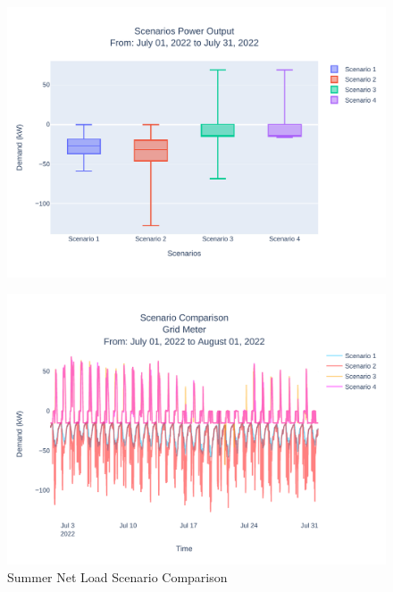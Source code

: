\documentclass[conference]{IEEEtran}
\begin{document}
	\begin{figure}[H]
		\centering
		\includegraphics[width=1\linewidth]{Fig/4_Scn_Output_Run_2_Jul_01_2022_to_Jul_31_2022}
		\caption{}
		\label{fig:4scnoutputrun2jul012022tojul312022}
	\end{figure}
	
	



    
	\begin{figure}[H]
		\centering
		\includegraphics[width=1\linewidth]{Fig/net_load_scenario_comparison_summer_run_2}
		\caption{Summer Net Load Scenario Comparison}
		\label{fig:netloadscenariocomparisonsummer}
	\end{figure}
	
\end{document}
